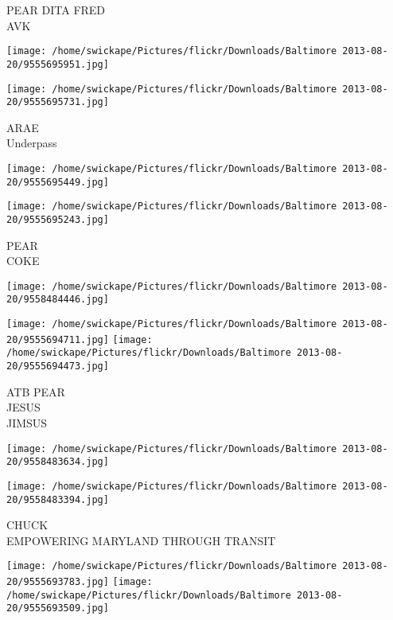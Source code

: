 \documentclass[10pt,letterpaper]{article}
\begin{document}
PEAR DITA FRED\\
AVK\\
\pagebreak

\texttt{[image: /home/swickape/Pictures/flickr/Downloads/Baltimore 2013-08-20/9555695951.jpg]}

\vspace{0.25in}
\texttt{[image: /home/swickape/Pictures/flickr/Downloads/Baltimore 2013-08-20/9555695731.jpg]}

ARAE\\
Underpass\\
\pagebreak

\texttt{[image: /home/swickape/Pictures/flickr/Downloads/Baltimore 2013-08-20/9555695449.jpg]}

\vspace{0.25in}
\texttt{[image: /home/swickape/Pictures/flickr/Downloads/Baltimore 2013-08-20/9555695243.jpg]}

PEAR\\
COKE\\
\pagebreak

\texttt{[image: /home/swickape/Pictures/flickr/Downloads/Baltimore 2013-08-20/9558484446.jpg]}

\vspace{0.25in}
\texttt{[image: /home/swickape/Pictures/flickr/Downloads/Baltimore 2013-08-20/9555694711.jpg]}
\texttt{[image: /home/swickape/Pictures/flickr/Downloads/Baltimore 2013-08-20/9555694473.jpg]}

ATB PEAR\\
JESUS\\
JIMSUS\\
\pagebreak

\texttt{[image: /home/swickape/Pictures/flickr/Downloads/Baltimore 2013-08-20/9558483634.jpg]}

\vspace{0.25in}
\texttt{[image: /home/swickape/Pictures/flickr/Downloads/Baltimore 2013-08-20/9558483394.jpg]}

CHUCK\\
EMPOWERING MARYLAND THROUGH TRANSIT\\
\pagebreak

\texttt{[image: /home/swickape/Pictures/flickr/Downloads/Baltimore 2013-08-20/9555693783.jpg]}
\texttt{[image: /home/swickape/Pictures/flickr/Downloads/Baltimore 2013-08-20/9555693509.jpg]}
\end{document}
